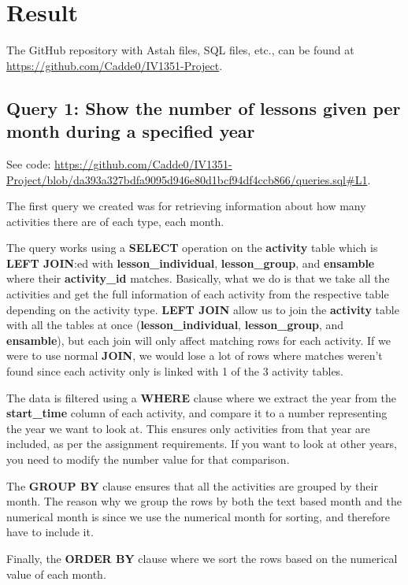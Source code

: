 \documentclass[a4paper]{scrartcl}
\begin{document}
\section{Result}

The GitHub repository with Astah files, SQL files, etc., can be found at \url{https://github.com/Cadde0/IV1351-Project}.

\subsection{Query 1: Show the number of lessons given per month during a specified year}
See code: \url{https://github.com/Cadde0/IV1351-Project/blob/da393a327bdfa9095d946e80d1bcf94df4ccb866/queries.sql#L1}.

The first query we created was for retrieving information about how many activities there are of each type, each month.

The query works using a \textbf{SELECT} operation on the \textbf{activity} table which is \textbf{LEFT JOIN}:ed with \textbf{lesson\_individual}, \textbf{lesson\_group}, and \textbf{ensamble} where their \textbf{activity\_id} matches. Basically, what we do is that we take all the activities and get the full information of each activity from the respective table depending on the activity type. \textbf{LEFT JOIN} allow us to join the \textbf{activity} table with all the tables at once (\textbf{lesson\_individual}, \textbf{lesson\_group}, and \textbf{ensamble}), but each join will only affect matching rows for each activity. If we were to use normal \textbf{JOIN}, we would lose a lot of rows where matches weren't found since each activity only is linked with 1 of the 3 activity tables.

The data is filtered using a \textbf{WHERE} clause where we extract the year from the \textbf{start\_time} column of each activity, and compare it to a number representing the year we want to look at. This ensures only activities from that year are included, as per the assignment requirements. If you want to look at other years, you need to modify the number value for that comparison.

The \textbf{GROUP BY} clause ensures that all the activities are grouped by their month. The reason why we group the rows by both the text based month and the numerical month is since we use the numerical month for sorting, and therefore have to include it. 

Finally, the \textbf{ORDER BY} clause where we sort the rows based on the numerical value of each month.
\end{document}
